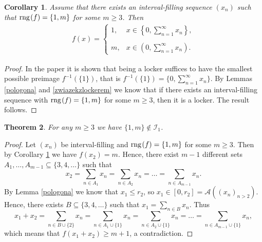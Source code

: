\documentclass{amsart}
\newtheorem{theorem}{Theorem}[section]
\newtheorem{corollary}[theorem]{Corollary}
\theoremstyle{definition}
\newcommand{\rng}{{\rm rng} \hspace{0.03cm}}
\begin{document}
\begin{corollary}\label{calewnetrze}
Assume that there exists an interval-filling sequence $(x_{n})$ such that $\rng (f)=\{1,m\}$ for some $m\geq 3$. Then
\begin{align*}
f(x)=\left\{\begin{array}{ll}
1, & x\in \left\{0,\sum_{n=1}^{\infty}x_{n}\right\},  \\
 & \\
m, & x\in \left(0,\sum_{n=1}^{\infty}x_{n}\right).
\end{array}\right.
\end{align*}
\end{corollary}
\begin{proof}
In the paper \cite{DJK} it is shown that being a locker suffices to have the smallest possible preimage $f^{-1}(\{1\})$, that is $f^{-1}(\{1\})=\{0, \sum_{n=1}^{\infty}x_n\}$. By Lemmas \ref{pologona} and \ref{zwiazekzlockerem} we know that if there exists an interval-filling sequence with $\rng(f)=\{1,m\}$ for some $m\geq 3$, then it is a locker. The result follows.
\end{proof}

\begin{theorem}\label{niemozliwy}
For any $m\geq 3$ we have $\{1,m\}\notin \mathcal{I}_1$.
\end{theorem}
\begin{proof}
Let $(x_n)$ be interval-filling and $\rng(f)=\{1,m\}$ for some $m\geq 3$. Then by Corollary \ref{calewnetrze} we have $f(x_2)=m$. Hence, there exist $m-1$ different sets $A_1,\ldots,A_{m-1}\subseteq \{3,4,\ldots\}$ such that 
$$
x_2=\sum_{n\in A_1}x_n=\sum_{n\in A_2}x_n=\ldots=\sum_{n\in A_{m-1}}x_n.
$$
By Lemma \ref{pologona} we know that $x_1\leq r_2$, so $x_{1}\in [0,r_{2}]=\mathcal{A}((x_{n})_{n>2})$. Hence, there exists $B\subseteq\{3,4,\ldots\}$ such that $x_1=\sum_{n\in B}x_n$. Thus
$$
x_1+x_2=\sum_{n\in B\cup\{2\}}x_n=\sum_{n\in A_1\cup\{1\}}x_n=\sum_{n\in A_2\cup\{1\}}x_n=\ldots=\sum_{n\in A_{m-1}\cup\{1\}}x_n,
$$
which means that $f(x_1+x_2)\geq m+1$, a contradiction.
\end{proof}


\end{document}
